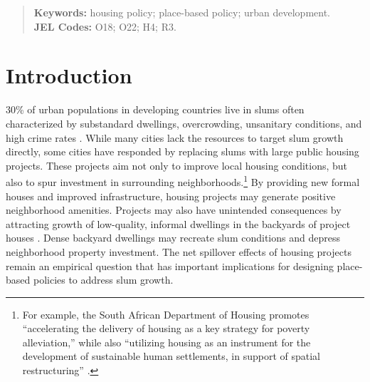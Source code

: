 \documentclass[12pt]{article}
\begin{document}
\begin{titlepage}
\begin{abstract}


\vspace{.1in}
\textbf{Keywords:} housing policy; place-based policy; urban development.\\
\textbf{JEL Codes:} O18; O22; H4; R3.  \\
\bigskip
\end{abstract}
\setcounter{page}{0}
\thispagestyle{empty}
\end{titlepage}

\section{Introduction} \label{sec:introduction}



30\% of urban populations in developing countries live in slums often characterized by substandard dwellings, overcrowding, unsanitary conditions, and high crime rates \citep{mdg}.  While many cities lack the resources to target slum growth directly, some cities have responded by replacing slums with large public housing projects.  These projects aim not only to improve local housing conditions, but also to spur investment in surrounding neighborhoods.\footnote{For example, the South African Department of Housing promotes ``accelerating the delivery of housing as a key strategy for poverty alleviation,'' while also ``utilizing housing as an instrument for the development of sustainable human settlements, in support of spatial restructuring'' \citep{bng}.}  By providing new formal houses and improved infrastructure, housing projects may generate positive neighborhood amenities.  Projects may also have unintended consequences by attracting growth of low-quality, informal dwellings in the backyards of project houses \citep{Brueckner2018backyarding}.  Dense backyard dwellings may recreate slum conditions and depress neighborhood property investment.  The net spillover effects of housing projects remain an empirical question that has important implications for designing place-based policies to address slum growth.
\end{document}
